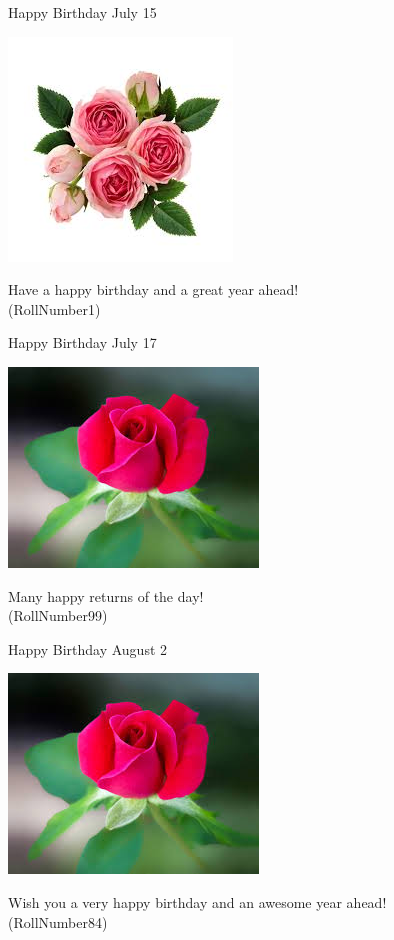 \documentclass[table, landscape]{beamer}
\begin{document}
\begin{frame}{\color{blue}Happy Birthday }
{July 15}
\begin{center}
\includegraphics[height=0.5\textheight]{flowers/f5.jpeg}

Have a happy birthday and a great year ahead! \\ \vspace{0.5cm}{\Large name1} (RollNumber1)
\end{center}
\end{frame}
\begin{frame}{\color{blue}Happy Birthday }
{July 17}
\begin{center}
\includegraphics[height=0.5\textheight]{flowers/f3.jpeg}

Many happy returns of the day! \\ \vspace{0.5cm}{\Large name92} (RollNumber99)
\end{center}
\end{frame}
\begin{frame}{\color{blue}Happy Birthday }
{August 2}
\begin{center}
\includegraphics[height=0.5\textheight]{flowers/f3.jpeg}

Wish you a very happy birthday and an awesome year ahead! \\ \vspace{0.5cm}{\Large name77} (RollNumber84)
\end{center}
\end{frame}
\end{document}
